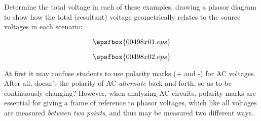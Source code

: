 

Determine the total voltage in each of these examples, drawing a phasor diagram to show how the total (resultant) voltage geometrically relates to the source voltages in each scenario:

$$\epsfbox{00498x01.eps}$$







$$\epsfbox{00498x02.eps}$$







At first it may confuse students to use polarity marks (+ and -) for AC voltages.  After all, doesn't the polarity of AC {\it alternate} back and forth, so as to be continuously changing?  However, when analyzing AC circuits, polarity marks are essential for giving a frame of reference to phasor voltages, which like all voltages are measured {\it between two points}, and thus may be measured two different ways.





